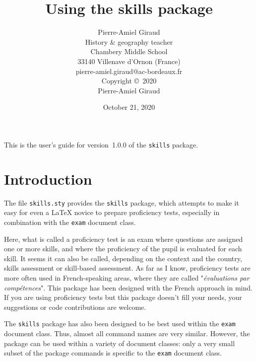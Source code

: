 \documentclass[12pt]{exam}
\newcommand{\docversion}{1.0.0}
\newcommand{\docdate}{October 21, 2020}
\begin{document}
\title{Using the skills package}

\author{Pierre-Amiel Giraud\\
  History \& geography teacher\\
  Chambery Middle School\\
  33140 Villenave d'Ornon (France)\\
  pierre-amiel.giraud@ac-bordeaux.fr\\[\bigskipamount]
  Copyright \copyright~2020\\
  Pierre-Amiel Giraud}

\date{\docdate}

\maketitle

\begin{center}
  \small
  This is the user's guide for version~\docversion{} of the
  \verb"skills" package. 
\end{center}

\tableofcontents
\section{Introduction}

The file \verb"skills.sty" provides the \verb"skills" package,
which attempts to make it easy for even a \LaTeX{} novice to prepare
proficiency tests, especially in combination with the \verb|exam| document
class.

Here, what is called a proficiency test is an exam where questions are assigned
one or more skills, and where the proficiency of the pupil is evaluated for each skill.
It seems it can also be called, depending on the context and the country, skills assessment
or skill-based assessment. As far as I know, proficiency tests are more often used in French-speaking areas, where they are called "\textit{évaluations par compétences}". This package has
been designed with the French approach in mind. If you are using proficiency tests
but this package doesn't fill your needs, your suggestions or code contributions are welcome.

The \verb|skills| package has also been designed to be best used within the \verb|exam| document class. Thus, almost all command names are very similar. However, the package can be used within a variety of document classes: only a very small subset of the package commands is specific to the \verb|exam| document class.
\end{document}

